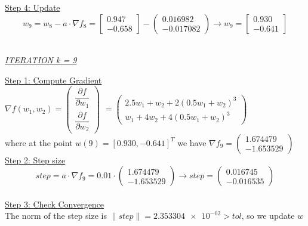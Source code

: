 \underline{Step 4: Update}
\[ 
w_9 = w_8 - a\cdot \nabla f_8 =  \left[\begin{array}{c}
	0.947\\
	-0.658
\end{array}\right] - \left(\begin{array}{c}
	0.016982 \\
-0.017082
\end{array}\right) \rightarrow
w_9 = \left[\begin{array}{c}
	0.930\\
	-0.641
\end{array}\right]
\]
\\[4mm]

\begin{center}
	\underline{\textit{ITERATION k = 9}}
\end{center}

\underline{Step 1: Compute Gradient}\\
\(\nabla f(w_1,w_2) = \left(\begin{array}{c}
	\dfrac{\partial f}{\partial w_1} \\[4mm]
	\dfrac{\partial f}{\partial w_2}
\end{array}\right)\) $= \left(\begin{array}{c}
	2.5w_1 + w_2 + 2(0.5w_1+w_2)^3\\[1mm]
	w_1 + 4w_2 + 4(0.5w_1+w_2)^3
\end{array}\right)$ \\[3mm]

where at the point $w\left(9\right) = \left[0.930,	-0.641\right]^T$ we have $\nabla f_{9} = \left(\begin{array}{c}
	1.674479 \\
	-1.653529
\end{array}\right)$
\\[4mm]

\underline{Step 2: Step size}
\[
step = a \cdot \nabla f_{9} = 0.01 \cdot \left(\begin{array}{c}
	1.674479 \\
-1.653529
\end{array}\right) \rightarrow step =\left(\begin{array}{c}
	0.016745 \\
	-0.016535
\end{array}\right)
\]
\\[4mm]

\underline{Step 3: Check Convergence}\\
The norm of the step size is $\| step \| = \num{2.353304e-02} > tol$, so we update $w$
\\[4mm]

